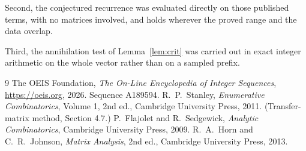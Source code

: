 \documentclass[11pt,a4paper]{article}
\theoremstyle{plain}
\theoremstyle{definition}
\begin{document}
Second, the conjectured recurrence was evaluated directly on those published terms, with no
matrices involved, and holds wherever the proved range and the data overlap.

Third, the annihilation test of Lemma~\ref{lem:crit} was carried out in exact integer
arithmetic on the whole vector rather than on a sampled prefix.

\begin{thebibliography}{9}
 The OEIS Foundation, \emph{The On-Line Encyclopedia of Integer
Sequences}, \url{https://oeis.org}, 2026. Sequence A189594.
 R.~P.~Stanley, \emph{Enumerative Combinatorics}, Volume 1, 2nd ed.,
Cambridge University Press, 2011. (Transfer-matrix method, Section 4.7.)
 P.~Flajolet and R.~Sedgewick, \emph{Analytic Combinatorics}, Cambridge
University Press, 2009.
 R.~A.~Horn and C.~R.~Johnson, \emph{Matrix Analysis}, 2nd ed., Cambridge
University Press, 2013.
\end{thebibliography}
\end{document}
